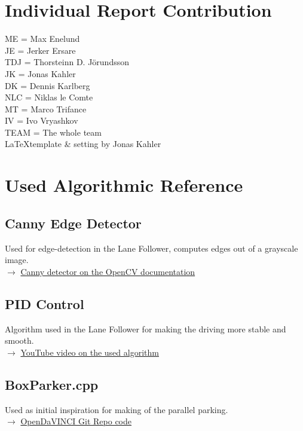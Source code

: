\label{appendix}
\appendix

\chapter{Individual Report Contribution}
ME = Max Enelund\\
JE = Jerker Ersare\\
TDJ = Thorsteinn D. J{\"o}rundsson\\
JK = Jonas Kahler\\
DK = Dennis Karlberg\\
NLC = Niklas le Comte\\
MT = Marco Trifance\\
IV = Ivo Vryashkov\\
TEAM = The whole team\\
\LaTeX template \& setting by Jonas Kahler

\chapter{Used Algorithmic Reference}
\section{Canny Edge Detector}
Used for edge-detection in the Lane Follower, computes edges out of a grayscale
image.\\
$\rightarrow$
\href{http://docs.opencv.org/2.4/doc/tutorials/imgproc/imgtrans/canny_detector/canny_detector.html}{Canny detector on the OpenCV documentation}

\section{PID Control}
Algorithm used in the Lane Follower for making the driving more stable and
smooth.\\
$\rightarrow$
\href{https://www.youtube.com/watch?v=4Y7zG48uHRo}
{YouTube video on the used algorithm}

\section{BoxParker.cpp}
Used as initial inspiration for making of the parallel parking.\\
$\rightarrow$
\href{https://github.com/se-research/OpenDaVINCI/blob/master/automotive/miniature/boxparker/src/BoxParker.cpp}
{OpenDaVINCI Git Repo code}
